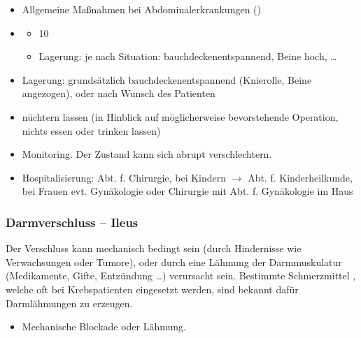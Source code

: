 {\label{m:am-abdominalerkrankungen}}
{
\begin{itemize}
  \item Allgemeine Maßnahmen bei Abdominalerkrankungen
  ()
  \item {} \TxBeiVit
  \TxMassVitBes
  \begin{itemize}
    \item {} 10\LMin
    \item Lagerung: je nach Situation: bauchdeckenentspannend,
    Beine hoch, \ldots
  \end{itemize}
  \item Lagerung: grundsätzlich bauchdeckenentspannend
  (Knierolle, Beine angezogen), oder nach Wunsch des Patienten
  \item nüchtern lassen (in Hinblick auf möglicherweise bevorstehende
  Operation, nichts essen oder trinken lassen)
  \item Monitoring. Der Zustand kann sich abrupt
  verschlechtern.
  \item Hospitalisierung: Abt. f. Chirurgie, bei Kindern ${\rightarrow}$
  Abt. f. Kinderheilkunde, bei Frauen evt. Gynäkologie oder Chirurgie mit
  Abt. f. Gynäkologie im Haus 
\end{itemize}
}


\subsubsection{Darmverschluss -- Ileus}



{

Der Verschluss kann mechanisch bedingt sein (durch
Hindernisse wie Verwachsungen oder Tumore), oder durch eine
Lähmung der Darmmuskulatur (Medikamente, Gifte, Entzündung
\ldots) verursacht sein. Bestimmte Schmerzmittel
, welche oft bei Krebspatienten eingesetzt
werden, sind bekannt dafür Darmlähmungen zu erzeugen. 
}{
\begin{itemize}
  \item Mechanische Blockade oder Lähmung.
\end{itemize}
}{}{}{}


